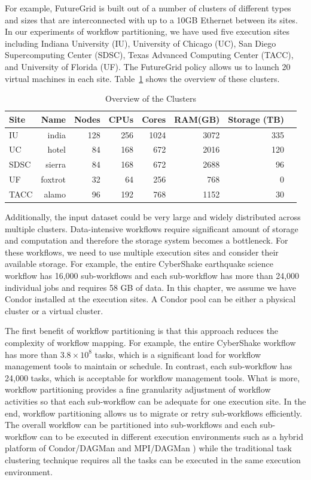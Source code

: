 For example, FutureGrid is built out of a number of clusters of different types and sizes that are interconnected with up to a 10GB Ethernet between its sites. In our experiments of workflow partitioning, we have used five execution sites including Indiana University (IU), University of Chicago (UC), San Diego Supercomputing Center (SDSC), Texas Advanced Computing Center (TACC), and University of Florida (UF). The FutureGrid policy allows us to launch 20 virtual machines in each site. Table~\ref{tab:model_clusters} shows the overview of these clusters. 

\begin{table}[h!]
\caption{Overview of the Clusters}
\label{tab:model_clusters}
\centering
\begin{tabular}{lrrrrrrr}
\hline
Site &  Name &  Nodes & CPUs & Cores &  RAM(GB) & Storage (TB)     \\\hline
IU & india & 128 & 256 & 1024 & 3072 & 335 \\
UC & hotel & 84 & 168 & 672 & 2016 & 120 \\
SDSC & sierra & 84 & 168 & 672 & 2688 & 96 \\
UF & foxtrot & 32 & 64 & 256 & 768 & 0 \\
TACC & alamo & 96 & 192 & 768 & 1152 & 30 \\\hline
\end{tabular}
\end{table} 


Additionally, the input dataset could be very large and widely distributed across multiple clusters. Data-intensive workflows require significant amount of storage and computation and therefore the storage system becomes a bottleneck. For these workflows, we need to use multiple execution sites and consider their available storage. For example, the entire CyberShake earthquake science workflow has 16,000 sub-workflows and each sub-workflow has more than 24,000 individual jobs and requires 58 GB of data. In this chapter, we assume we have Condor installed at the execution sites. A Condor pool \cite{Kalayci2010} can be either a physical cluster or a virtual cluster. 

The first benefit of workflow partitioning is that this approach reduces the complexity of workflow mapping. For example, the entire CyberShake workflow has more than $3.8\times 10^8$ tasks, which is a significant load for workflow management tools to maintain or schedule. In contrast, each sub-workflow has 24,000 tasks, which is acceptable for workflow management tools. What is more, workflow partitioning provides a fine granularity adjustment of workflow activities so that each sub-workflow can be adequate for one execution site. In the end, workflow partitioning allows us to migrate or retry sub-workflows efficiently. The overall workflow can be partitioned into sub-workflows and each sub-workflow can to be executed in different execution environments such as a hybrid platform of Condor/DAGMan \cite{DAGMan} and MPI/DAGMan \cite{Rynge2012}) while the traditional task clustering technique requires all the tasks can be executed in the same execution environment. 


